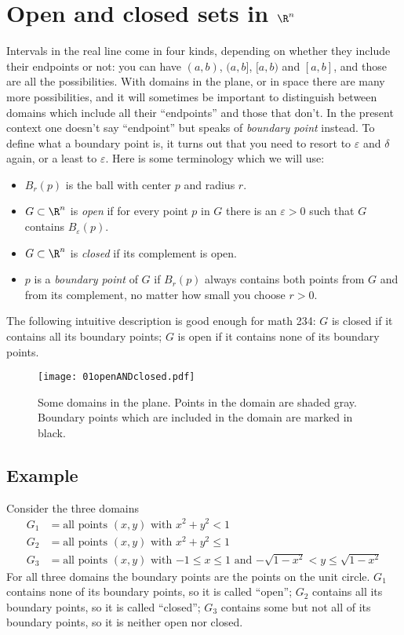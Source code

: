 \section{Open and closed sets in $\R^n$} %
Intervals in the real line come in four kinds, depending on whether
they include their endpoints or not: you can have $(a,b)$, $(a, b]$,
$[a, b)$ and $[a,b]$, and those are all the possibilities.  With
domains in the plane, or in space there are many more possibilities,
and it will sometimes be important to distinguish between domains
which include all their ``endpoints'' and those that don't.  In the
present context one doesn't say ``endpoint'' but speaks of
\emph{boundary point} instead.  To define what a boundary point is, it
turns out that you need to resort to $\varepsilon$ and $\delta$ again,
or a least to $\varepsilon$.
Here is some terminology which we will use:
\begin{itemize}
\item $B_r(p)$ is the ball with center $p$ and radius $r$.

\item $G\subset \R^n$ is \emph{open} if for every point $p$ in $G$ there is an
  $\varepsilon>0$ such that $G$ contains $B_\varepsilon(p)$.

\item $G\subset\R^n$ is \emph{closed} if its complement is open.

\item $p$ is a \emph{boundary point} of $G$ if $B_r(p)$ always contains both
  points from $G$ and from its complement, no matter how small you
  choose $r>0$.
\end{itemize}
The following intuitive description is good enough for math 234: $G$
is closed if it contains all its boundary points; $G$ is open if it
contains none of its boundary points.

\begin{figure}[ht]\centering
  \texttt{[image: 01openANDclosed.pdf]}
  \caption{Some domains in the plane.  Points in the domain are shaded
  gray.  Boundary points which are included in the domain are marked
  in black.}
  \label{fig:01openANDclosed}
\end{figure}

\subsection{Example}\label{sec:openClosedExample} Consider the three domains %
\begin{align*}
  G_1 &= \text{all points $(x, y)$ with $x^2+y^2<1$}\\
  G_2 &= \text{all points $(x, y)$ with $x^2+y^2\le1$}\\
  G_3 &= \text{all points $(x, y)$ with $-1\leq x\leq 1$ and
  $-\sqrt{1-x^2}<y\leq \sqrt{1-x^2}$}
\end{align*}
For all three domains the boundary points are the points on the unit
circle.  $G_1$ contains none of its boundary points, so it is called
``open'';  $G_2$ contains all its boundary points, so it is called
``closed'';  $G_3$ contains some but not all of its boundary points,
so it is neither open nor closed.



